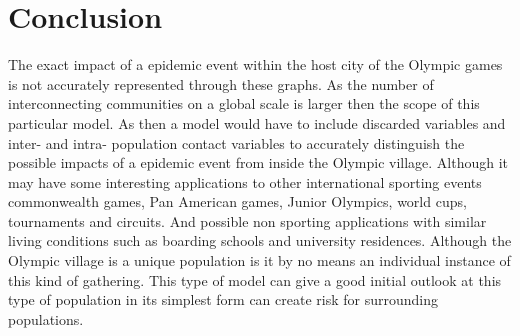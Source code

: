 \documentclass[12pt, oneside]{article}
\begin{document}
\section*{Conclusion} 
The exact impact of a epidemic event within the host city of the Olympic games is not accurately represented through these graphs. As the number of interconnecting communities on a global scale is larger then the scope of this particular model. As then a model would have to include discarded variables and inter- and intra- population contact variables to accurately distinguish the possible impacts of a epidemic event from inside the Olympic village. Although it may have some interesting applications to other international sporting events commonwealth games, Pan American games, Junior Olympics, world cups, tournaments and circuits. And possible non sporting applications with similar living conditions such as boarding schools and university residences. Although the Olympic village is a unique population is it by no means an individual instance of this kind of gathering. This type of model can give a good initial outlook at this type of population in its simplest form can create risk for surrounding populations. 
\\
\\
\\
\\
\\
\\
\\
\\
\\
\\
\\
\\
\\
\\
\\
\\
\\
\\
\\
\\
\\
\\
\\



\end{document}
